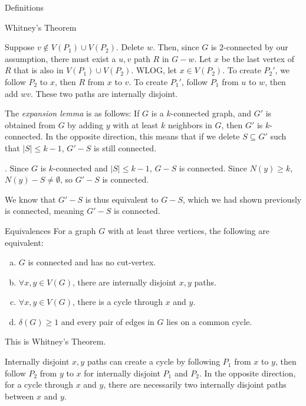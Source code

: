 \documentclass[10pt]{extarticle}
\begin{document}
\begin{problem}{Definitions}
\begin{problem}{Whitney's Theorem}
\begin{description}[font=\normalfont\scshape]
\begin{description}[font=\normalfont\scshape]
            Suppose $v\notin V(P_1) \cup V(P_2)$. Delete $w$. Then, since $G$ is $2$-connected by our assumption, there must exist a $u,v$ path $R$ in $G-w$. Let $x$ be the last vertex of $R$ that is also in $V(P_1) \cup V(P_2)$. WLOG, let $x\in V(P_2)$. To create $P_2'$, we follow $P_2$ to $x$, then $R$ from $x$ to $v$. To create $P_1'$, follow $P_1$ from $u$ to $w$, then add $wv$. These two paths are internally disjoint.
        \end{description}
    \end{description}
  \end{problem}
  The \textit{expansion lemma} is as follows: If $G$ is a $k$-connected graph, and $G'$ is obtained from $G$ by adding $y$ with at least $k$ neighbors in $G$, then $G'$ is $k$-connected. In the opposite direction, this means that if we delete $S\subseteq G'$ such that $|S| \leq k-1$, $G'-S$ is still connected.
  \begin{description}[font=\normalfont\scshape]
    \item[Case 1: $S\subseteq V(G)$]. Since $G$ is $k$-connected and $|S| \leq k-1$, $G-S$ is connected. Since $N(y) \geq k$, $N(y)-S \neq \emptyset$, so $G'-S$ is connected.
    \item[Case 2: $y\in S$] We know that $G'-S$ is thus equivalent to $G-S$, which we had shown previously is connected, meaning $G'-S$ is connected.
  \end{description}
  \begin{problem}{Equivalences}
    For a graph $G$ with at least three vertices, the following are equivalent:
    \begin{enumerate}[(a)]
      \item $G$ is connected and has no cut-vertex.
      \item $\forall x,y\in V(G)$, there are internally disjoint $x,y$ paths.
      \item $\forall x,y\in V(G)$, there is a cycle through $x$ and $y$.
      \item $\delta(G) \geq 1$ and every pair of edges in $G$ lies on a common cycle.
    \end{enumerate}
    \tcblower
    \begin{description}[font=\normalfont]
      \item[(a) $\Leftrightarrow$ (b):] This is Whitney's Theorem.
      \item[(b) $\Leftrightarrow$ (c):] Internally disjoint $x,y$ paths can create a cycle by following $P_1$ from $x$ to $y$, then follow $P_2$ from $y$ to $x$ for internally disjoint $P_1$ and $P_2$. In the opposite direction, for a cycle through $x$ and $y$, there are necessarily two internally disjoint paths between $x$ and $y$.
    \end{description}
  \end{problem}
\end{problem}
\end{document}
